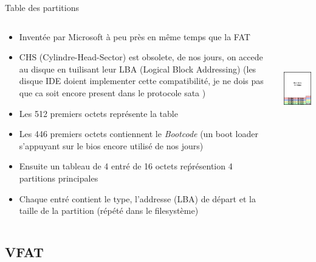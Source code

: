 \begin{frame}[fragile=singleslide]{Table des partitions}
  \begin{columns}
    \begin{column}{8cm}
      \begin{itemize}
      \item Inventée par Microsoft à peu près en même temps que la FAT
      \item CHS (Cylindre-Head-Sector) est  obsolete, de nos jours, on
        accede  au  disque  en   tuilisant  leur  LBA  (Logical  Block
        Addressing)   (les  disque   IDE   doient  implementer   cette
        compatibilité, je ne dois pas  que ca soit encore present dans
        le protocole sata )
      \item Les 512 premiers octets représente la table
      \item Les 446 premiers octets contiennent le \emph{Bootcode} (un
        boot  loader s'appuyant  sur  le bios  encore  utilisé de  nos
        jours)
      \item Ensuite un tableau de  4 entré de 16 octets reṕrésention 4
        partitions principales
      \item Chaque entré contient  le type, l'addresse (LBA) de départ
        et la taille de la partition (répété dans le filesystème)
      \end{itemize}
    \end{column}
    \begin{column}{4cm}
      \includegraphics[height=5cm]{pics/mbr}
    \end{column}
  \end{columns}
\end{frame}

\subsection{VFAT}

